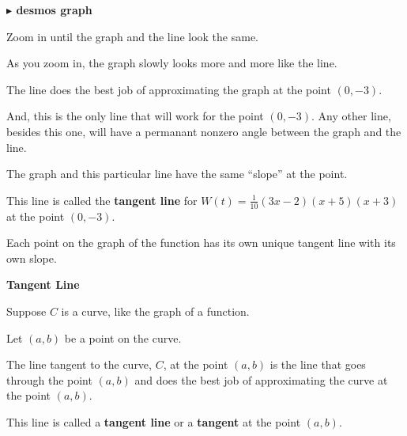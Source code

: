 \documentclass{ximera}
\begin{document}
\textbf{\textcolor{blue!55!black}{$\blacktriangleright$ desmos graph}} 
\begin{center}
\end{center}


Zoom in until the graph and the line look the same.



\begin{image}
\end{image}


As you zoom in, the graph slowly looks more and more like the line. 


The line does the best job of approximating the graph at the point $(0,-3)$. 


And, this is the only line that will work for the point $(0,-3)$.  Any other line, besides this one, will have a permanant nonzero angle between the graph and the line.  

The graph and this particular line have the same ``slope'' at the point. 


This line is called the \textbf{\textcolor{blue!55!black}{tangent line}} for $W(t) = \frac{1}{10} (3x - 2)(x+5)(x+3)$ at the point $(0,-3)$.


Each point on the graph of the function has its own unique tangent line with its own slope.




\begin{idea} \textbf{\textcolor{blue!55!black}{Tangent Line}}


Suppose $C$ is a curve, like the graph of a function. 

Let $(a, b)$ be a point on the curve.

The line tangent to the curve, $C$, at the point $(a, b)$ is the line that goes through the point $(a, b)$ and does the best job of approximating the curve at the point $(a, b)$.

This line is called a \textbf{tangent line} or a \textbf{tangent} at the point $(a, b)$.




\end{idea}
\end{document}
